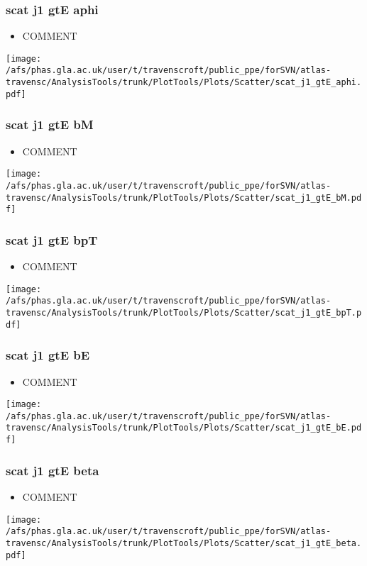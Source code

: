 \documentclass{beamer}
\begin{document}
\begin{frame}
\frametitle{scat j1 gtE aphi}
\begin{itemize}
\item COMMENT
\end{itemize}
\begin{center}
\texttt{[image: /afs/phas.gla.ac.uk/user/t/travenscroft/public\_ppe/forSVN/atlas-travensc/AnalysisTools/trunk/PlotTools/Plots/Scatter/scat\_j1\_gtE\_aphi.pdf]}
\end{center}
\end{frame}

\begin{frame}
\frametitle{scat j1 gtE bM}
\begin{itemize}
\item COMMENT
\end{itemize}
\begin{center}
\texttt{[image: /afs/phas.gla.ac.uk/user/t/travenscroft/public\_ppe/forSVN/atlas-travensc/AnalysisTools/trunk/PlotTools/Plots/Scatter/scat\_j1\_gtE\_bM.pdf]}
\end{center}
\end{frame}

\begin{frame}
\frametitle{scat j1 gtE bpT}
\begin{itemize}
\item COMMENT
\end{itemize}
\begin{center}
\texttt{[image: /afs/phas.gla.ac.uk/user/t/travenscroft/public\_ppe/forSVN/atlas-travensc/AnalysisTools/trunk/PlotTools/Plots/Scatter/scat\_j1\_gtE\_bpT.pdf]}
\end{center}
\end{frame}

\begin{frame}
\frametitle{scat j1 gtE bE}
\begin{itemize}
\item COMMENT
\end{itemize}
\begin{center}
\texttt{[image: /afs/phas.gla.ac.uk/user/t/travenscroft/public\_ppe/forSVN/atlas-travensc/AnalysisTools/trunk/PlotTools/Plots/Scatter/scat\_j1\_gtE\_bE.pdf]}
\end{center}
\end{frame}

\begin{frame}
\frametitle{scat j1 gtE beta}
\begin{itemize}
\item COMMENT
\end{itemize}
\begin{center}
\texttt{[image: /afs/phas.gla.ac.uk/user/t/travenscroft/public\_ppe/forSVN/atlas-travensc/AnalysisTools/trunk/PlotTools/Plots/Scatter/scat\_j1\_gtE\_beta.pdf]}
\end{center}
\end{frame}
\end{document}
